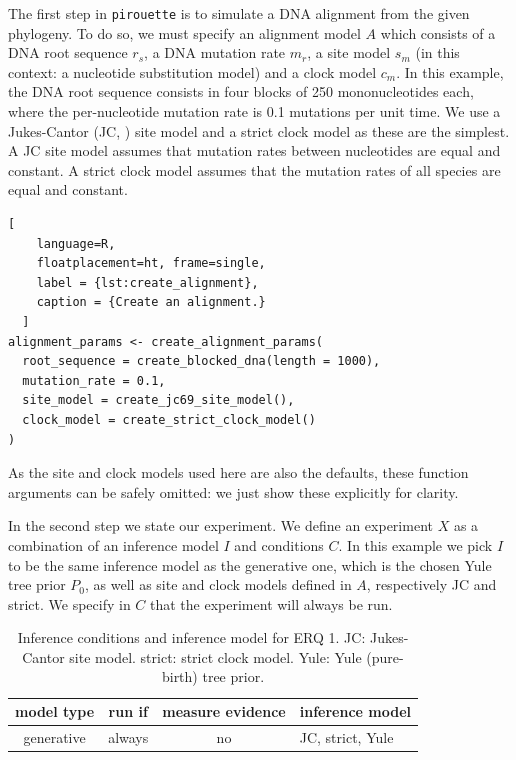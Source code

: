 \documentclass{article}
\begin{document}
The first step in \verb;pirouette; is to simulate a DNA alignment from the 
given phylogeny. 
To do so, we must specify an alignment model $\mathit{A}$ which consists of a 
DNA root sequence $\mathit{r_{s}}$, a DNA mutation rate $\mathit{m_{r}}$, a
site model $\mathit{s_{m}}$ (in this context: a nucleotide substitution model) 
and a clock model $\mathit{c_{m}}$. 
In this example, the DNA root sequence consists in four blocks of 250 
mononucleotides each, 
where the per-nucleotide mutation rate is 0.1 mutations per unit time.
We use a Jukes-Cantor (JC, \cite{jukes1969evolution}) site model
and a strict clock model as these are the simplest.
A JC site model
assumes that mutation rates between nucleotides are equal and constant. 
A strict clock model assumes that the mutation rates 
of all species are equal and constant.

\begin{lstlisting}[
    language=R,
    floatplacement=ht, frame=single,
    label = {lst:create_alignment}, 
    caption = {Create an alignment.}
  ]
alignment_params <- create_alignment_params(
  root_sequence = create_blocked_dna(length = 1000),
  mutation_rate = 0.1,
  site_model = create_jc69_site_model(),
  clock_model = create_strict_clock_model()
)
\end{lstlisting}

As the site and clock models used here are also the defaults, 
these function arguments can be safely omitted: we just show these
explicitly for clarity.

In the second step we state our experiment.
We define an experiment $\mathit{X}$ as a combination of an inference model 
$\mathit{I}$
and conditions $\mathit{C}$.
In this example we pick $\mathit{I}$ to be the same inference model as the 
generative one,
which is the chosen Yule tree prior $\mathit{P_{0}}$, as well as site and clock 
models defined in $\mathit{A}$, respectively JC and strict.
We specify in $\mathit{C}$ that the experiment will always be run.

\begin{table}
  \begin{tabular}{ | c | c | c | l | }
    \hline
    \textbf{model type} & \textbf{run if} & \textbf{measure evidence} & 
\textbf{inference model} \\ 
    \hline
    generative & always & no & JC, strict, Yule \\
    \hline
  \end{tabular}
  \caption{
    Inference conditions and inference model for ERQ 1.
    JC: Jukes-Cantor site model.
    strict: strict clock model.
    Yule: Yule (pure-birth) tree prior.
  }
  \label{tab:RQ1}
\end{table}
\end{document}
